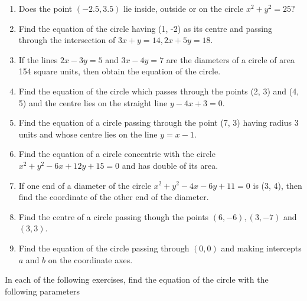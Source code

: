 \begin{enumerate}[label=\thesubsection.\arabic*, ref=\thesubsection.\theenumi]
  \item Does the point $(-2.5, 3.5)$ lie inside,  outside or on the circle $x^{2}+y^{2}=25?$
\\
\solution

 \item Find the equation of the circle having (1, -2) as its centre  and passing through the intersection of $3x+y=14,  2x+5y=18$.
\item If the lines $2x-3y=5$ and $3x-4y=7$ are the diameters of a circle of area 154 square units,  then obtain the equation of the circle.
\item Find the equation of the circle which passes through the points (2, 3) and (4, 5) and the centre lies on the straight line $y-4x+3=0$.
\item Find the equation of a circle passing through the point (7, 3) having radius 3 units and whose centre lies on the line $y=x-1$.
 \item Find the equation of a circle concentric with the circle $x^2+y^2-6x+12y+15=0$ and has double of its area.
 \item If one end of a diameter of the circle $x^2+y^2-4x-6y+11 =0$ is (3, 4),  then find the coordinate of the other end of the diameter.
\item Find the centre of a circle passing though the points $(6, -6),  (3, -7)$ and $(3, 3)$. \\ 
\label{chapters/10/7/4/3}
\solution 

  \item Find the equation of the circle passing through $(0, 0)$ and making intercepts $a$ and $b$ on the coordinate axes.
\end{enumerate}
In each of the following exercises,  find the equation of the circle with the following parameters
